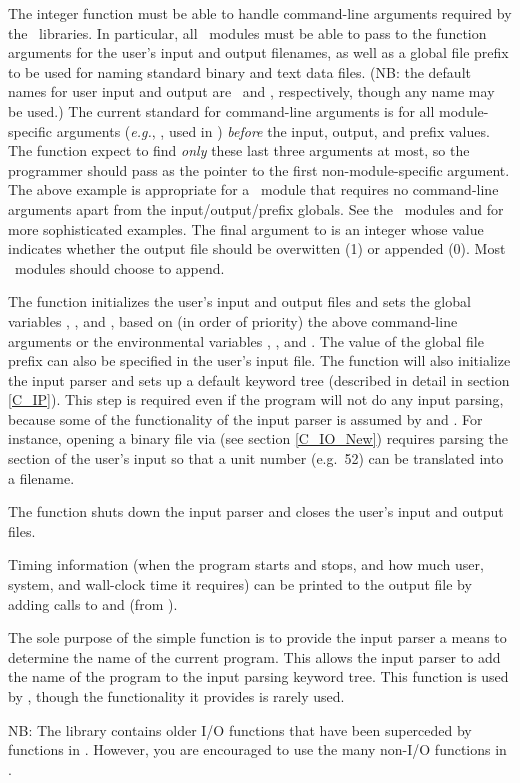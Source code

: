 The integer function  must be able to handle
command-line arguments required by the \PSIthree\ libraries.  In
particular, all \PSIthree\ modules must be able to pass to the
function  arguments for the user's input and
output filenames, as well as a global file prefix to be used for
naming standard binary and text data files.  (NB: the default names
for user input and output are \ and \outputdat, respectively,
though any name may be used.) The current standard for command-line
arguments is for all module-specific arguments ({\em e.g.},
, used in ) {\em before} the input,
output, and prefix values.  The  function expect
to find {\em only} these last three arguments at most, so the
programmer should pass as  the pointer to the first
non-module-specific argument.  The above example is appropriate for a
\PSIthree\ module that requires no command-line arguments apart from
the input/output/prefix globals.  See the \PSIthree\ modules
 and  for more sophisticated examples.
The final argument to  is an integer whose value
indicates whether the output file should be overwitten (1) or appended
(0).  Most \PSIthree\ modules should choose to append.

The  function initializes the user's input and
output files and sets the global variables ,
, and , based on (in order of
priority) the above command-line arguments or the environmental
variables , , and
.  The value of the global file prefix can also be
specified in the user's input file.  The  function
will also initialize the input parser and sets up a default keyword
tree (described in detail in section \ref{C_IP}).  This step is
required even if the program will not do any input parsing, because
some of the functionality of the input parser is assumed by
 and .  For instance, opening a
binary file via  (see section \ref{C_IO_New})
requires parsing the  section of the user's input so
that a unit number (e.g.~52) can be translated into a filename.

The  function shuts down the input parser and closes
the user's input and output files.

Timing information (when the program starts and stops, and how much
user, system, and wall-clock time it requires) can be printed to the
output file by adding calls to  and 
(from ).

The sole purpose of the simple function  is to provide
the input parser a means to determine the name of the current program.
This allows the input parser to add the name of the program to the
input parsing keyword tree.  This function is used by
, though the functionality it provides is rarely
used.

NB: The library  contains older I/O functions that
have been superceded by functions in .  However,
you are encouraged to use the many non-I/O functions in
.

